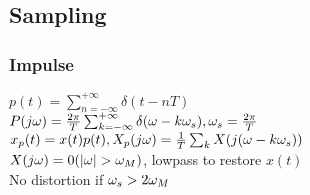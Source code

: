 \subsection{Sampling}
\subsubsection*{Impulse}

$p(t)=\sum_{n=-\infty}^{+\infty} \delta(t-nT)$\\
$P(j\omega)=\frac{2\pi}{T}\sum_{k=-\infty}^{+\infty} \delta(\omega-k\omega_s), \omega_s=\frac{2\pi}{T}$\\
$x_p(t)=x(t)p(t), X_p(j\omega) = \frac{1}{T}\sum_k X(j(\omega-k\omega_s))$\\
$X(j\om)=0(|\om|>\om_M)$, lowpass to restore $x(t)$\\
No distortion if $\omega_s>2\omega_M$